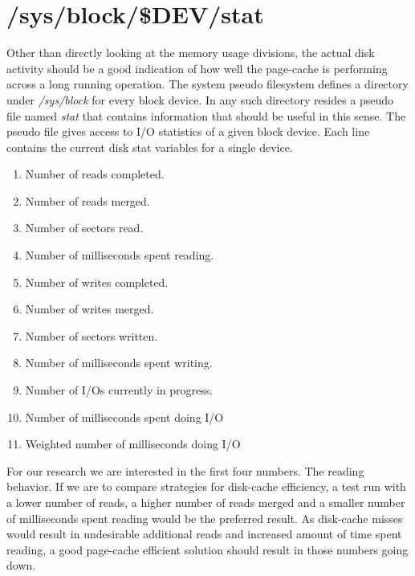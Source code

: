 \section{/sys/block/\$DEV/stat}
Other than directly looking at the memory usage divisions, the actual disk activity should be a good indication of how well the page-cache is performing across a long running operation. The system pseudo filesystem defines a directory under \emph{/sys/block} for every block device. In any such directory resides a pseudo file named \emph{stat} that contains information that should be useful in this sense. The pseudo file gives access to I/O statistics of a given block device. Each line contains the current disk stat variables for a single device. 
\begin{enumerate}
\item Number of reads completed.
\item Number of reads merged.
\item Number of sectors read.
\item Number of milliseconds spent reading.
\item Number of writes completed.
\item Number of writes merged.
\item Number of sectors written.
\item Number of milliseconds spent writing.
\item Number of I/Os currently in progress.
\item Number of milliseconds spent doing I/O
\item Weighted number of milliseconds doing I/O
\end{enumerate} 
For our research we are interested in the first four numbers. The reading behavior. If we are to compare strategies for disk-cache efficiency, a test run with a lower number of reads, a higher number of reads merged and a smaller number of milliseconds spent reading would be the preferred result. As disk-cache misses would result in undesirable additional reads and increased amount of time spent reading, a good page-cache efficient solution should result in those numbers going down. 

